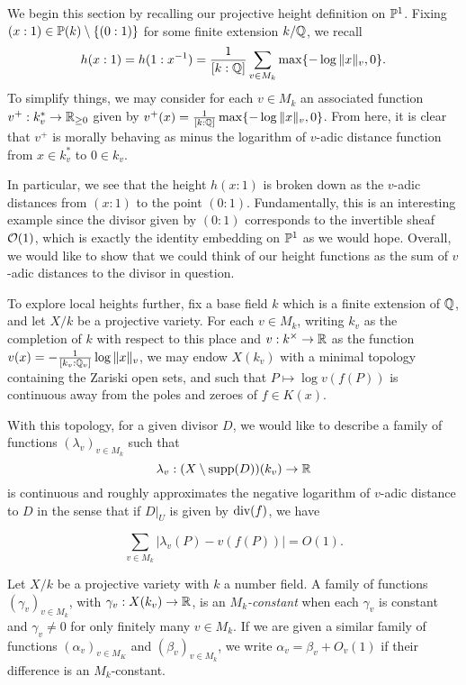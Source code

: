 We begin this section by recalling our projective height definition on $\mathbb{P}^1$.
Fixing $(x : 1) \in \mathbb{P}(k) \setminus \{ (0 : 1) \}$ for some finite extension $k / \mathbb{Q}$,
we recall
\[
    h(x : 1) 
    = h(1 : x^{-1}) 
    = \frac{1}{[k : \mathbb{Q}]}\sum_{v \in M_k} \max\{-\log \|x\|_v, 0\}.
\]
To simplify things,
we may consider for each $v \in M_k$ an associated function $v^+ : k_v^* \to \mathbb{R}_{\geq 0}$ given by ${v^+(x) = \frac{1}{[k : \mathbb{Q}]}\max\{-\log\|x\|_v, 0\}}$.
From here, it is clear that $v^+$ is morally behaving as minus the logarithm of $v$-adic distance function from $x \in k_v^*$ to $0 \in k_v$.

In particular, we see that the height $h(x : 1)$ is broken down as the $v$-adic distances from $(x: 1)$ to the point $(0 : 1)$.
Fundamentally, this is an interesting example since the divisor given by $(0 : 1)$ corresponds to the invertible sheaf $\mathcal{O}(1)$,
which is exactly the identity embedding on $\mathbb{P}^1$ as we would hope.
Overall, we would like to show that we could think of our height functions as the sum of $v$-adic distances to the divisor in question.

To explore local heights further, fix a base field $k$ which is a finite extension of $\mathbb{Q}$,
and let $X/k$ be a projective variety.
For each $v \in M_k$, writing $k_v$ as the completion of $k$ with respect to this place and $v : k^\times \to \mathbb{R}$ as the function $v(x) = -\frac{1}{[k_v : \mathbb{Q}_v]} \log \|x\|_v$,
we may endow $X(k_v)$ with a minimal topology containing the Zariski open sets, 
and such that $P \mapsto \log v(f(P))$ is continuous away from the poles and zeroes of $f \in K(x)$. 

With this topology, for a given divisor $D$,
we would like to describe a family of functions $(\lambda_v)_{v \in M_k}$ such that
\[
    \lambda_v : (X \setminus {\rm supp}(D))(k_v) \to \mathbb{R}
\]
is continuous and roughly approximates the negative logarithm of $v$-adic distance to $D$ in the sense that if $D|_U$ is given by ${\rm div}(f)$, we have

\[
    \sum_{v \in M_k} |\lambda_v(P) - v(f(P))| = O(1).
\]

\begin{definition}
    Let $X/k$ be a projective variety with $k$ a number field.
    A family of functions $(\gamma_v)_{v \in M_k}$, with $\gamma_v : X(k_v) \to \mathbb{R}$,
    is an \textit{$M_k$-constant} when each $\gamma_v$ is constant and $\gamma_v \neq 0$ for only finitely many $v \in M_k$.
    If we are given a similar family of functions $(\alpha_v)_{v \in M_K}$ and $(\beta_v)_{v \in M_k}$,
    we write $\alpha_v = \beta_v + O_v(1)$ if their difference is an $M_k$-constant.
\end{definition}

